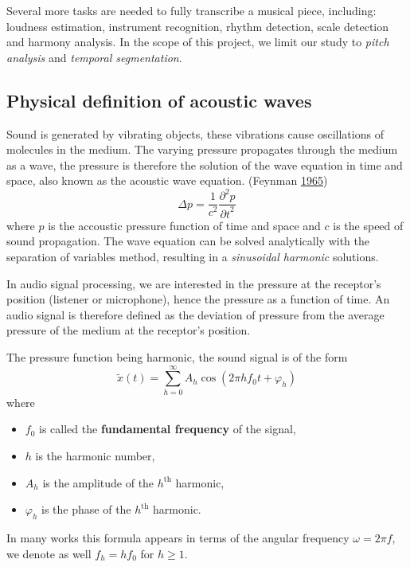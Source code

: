 \documentclass[american,]{article}
\providecommand{\tightlist}{%
  \setlength{\itemsep}{0pt}\setlength{\parskip}{0pt}}
\begin{document}
Several more tasks are needed to fully transcribe a musical
piece, including: loudness estimation, instrument recognition,
rhythm detection, scale detection and harmony analysis.
In the scope of this project, we limit our study to
\emph{pitch analysis} and \emph{temporal segmentation}.

\hypertarget{physical-definition-of-acoustic-waves}{%
\subsection{Physical definition of acoustic waves}\label{physical-definition-of-acoustic-waves}}

Sound is generated by vibrating objects, these vibrations
cause oscillations of molecules in the medium.
The varying pressure propagates through the medium as a wave,
the pressure is therefore the solution of the wave
equation in time and space, also known as the acoustic
wave equation. (Feynman \protect\hyperlink{ref-feynman}{1965})
\[\Delta p =\frac{1}{c^2}\frac{\partial^2 p}{ {\partial t}^2}\]
where \(p\) is the accoustic pressure function of time and space
and \(c\) is the speed of sound propagation.
The wave equation can be solved analytically with the
separation of variables method, resulting in a \emph{sinusoidal
harmonic} solutions.

In audio signal processing, we are interested in the pressure
at the receptor's position (listener or microphone),
hence the pressure as a function of time.
An audio signal is therefore defined as the deviation
of pressure from the average pressure of the medium
at the receptor's position.

The pressure function being harmonic, the sound signal
is of the form
\[\tilde{x}(t) = \sum_{h=0}^{\infty} A_h \cos(2\pi hf_0t + \varphi_h)\]
where

\begin{itemize}
\tightlist
\item
  \(f_0\) is called the \textbf{fundamental frequency} of the signal,
\item
  \(h\) is the harmonic number,
\item
  \(A_h\) is the amplitude of the \(h^\text{th}\) harmonic,
\item
  \(\varphi_h\) is the phase of the \(h^\text{th}\) harmonic.
\end{itemize}

In many works this formula appears in terms of the angular
frequency \(\omega=2\pi f\), we denote as well
\(f_h = h f_0\) for \(h\geq 1\).
\end{document}
